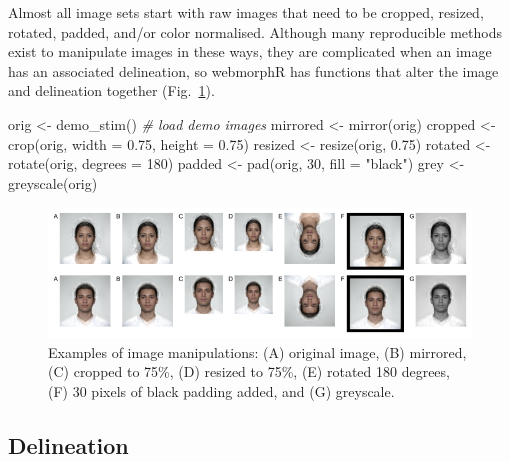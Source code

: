 \documentclass[
  man,floatsintext]{apa6}
\newenvironment{Shaded}{\begin{snugshade}}{\end{snugshade}}
\newcommand{\AttributeTok}[1]{\textcolor[rgb]{0.77,0.63,0.00}{#1}}
\newcommand{\CommentTok}[1]{\textcolor[rgb]{0.56,0.35,0.01}{\textit{#1}}}
\newcommand{\DecValTok}[1]{\textcolor[rgb]{0.00,0.00,0.81}{#1}}
\newcommand{\FloatTok}[1]{\textcolor[rgb]{0.00,0.00,0.81}{#1}}
\newcommand{\FunctionTok}[1]{\textcolor[rgb]{0.00,0.00,0.00}{#1}}
\newcommand{\NormalTok}[1]{#1}
\newcommand{\OtherTok}[1]{\textcolor[rgb]{0.56,0.35,0.01}{#1}}
\newcommand{\StringTok}[1]{\textcolor[rgb]{0.31,0.60,0.02}{#1}}
\begin{document}
Almost all image sets start with raw images that need to be cropped, resized, rotated, padded, and/or color normalised. Although many reproducible methods exist to manipulate images in these ways, they are complicated when an image has an associated delineation, so webmorphR has functions that alter the image and delineation together (Fig.~\ref{fig:editing}).

\begin{Shaded}
\begin{Highlighting}[]
\NormalTok{orig }\OtherTok{\textless{}{-}} \FunctionTok{demo\_stim}\NormalTok{() }\CommentTok{\# load demo images}
\NormalTok{mirrored }\OtherTok{\textless{}{-}} \FunctionTok{mirror}\NormalTok{(orig)}
\NormalTok{cropped  }\OtherTok{\textless{}{-}} \FunctionTok{crop}\NormalTok{(orig, }\AttributeTok{width =} \FloatTok{0.75}\NormalTok{, }\AttributeTok{height =} \FloatTok{0.75}\NormalTok{)}
\NormalTok{resized  }\OtherTok{\textless{}{-}} \FunctionTok{resize}\NormalTok{(orig, }\FloatTok{0.75}\NormalTok{)}
\NormalTok{rotated  }\OtherTok{\textless{}{-}} \FunctionTok{rotate}\NormalTok{(orig, }\AttributeTok{degrees =} \DecValTok{180}\NormalTok{)}
\NormalTok{padded   }\OtherTok{\textless{}{-}} \FunctionTok{pad}\NormalTok{(orig, }\DecValTok{30}\NormalTok{, }\AttributeTok{fill =} \StringTok{"black"}\NormalTok{)}
\NormalTok{grey     }\OtherTok{\textless{}{-}} \FunctionTok{greyscale}\NormalTok{(orig)}
\end{Highlighting}
\end{Shaded}



\begin{figure}
\includegraphics[width=1\linewidth]{index_files/figure-latex/editing-1} \caption{Examples of image manipulations: (A) original image, (B) mirrored, (C) cropped to 75\%, (D) resized to 75\%, (E) rotated 180 degrees, (F) 30 pixels of black padding added, and (G) greyscale.}\label{fig:editing}
\end{figure}

\hypertarget{delineation}{%
\subsection{Delineation}\label{delineation}}
\end{document}
